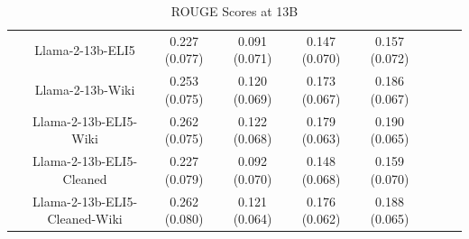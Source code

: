 \documentclass[11pt, oneside]{article}   	%
\begin{document}
\begin{table}[ht]
\begin{tabular}{lcccccccc}
& Llama-2-13b-ELI5 & 0.227 (0.077) & 0.091 (0.071) & 0.147 (0.070) & 0.157 (0.072) \\
& Llama-2-13b-Wiki & 0.253 (0.075) & 0.120 (0.069) & 0.173 (0.067) & 0.186 (0.067) \\
& Llama-2-13b-ELI5-Wiki & 0.262 (0.075) & 0.122 (0.068) & 0.179 (0.063) & 0.190 (0.065) \\
& Llama-2-13b-ELI5-Cleaned & 0.227 (0.079) & 0.092 (0.070) & 0.148 (0.068) & 0.159 (0.070) \\
& Llama-2-13b-ELI5-Cleaned-Wiki & 0.262 (0.080) & 0.121 (0.064) & 0.176 (0.062) & 0.188 (0.065) \\
\bottomrule
\end{tabular}
\caption{ROUGE Scores at 13B}
\label{tab:rouge_scores_13B}
\end{table}
\end{document}
